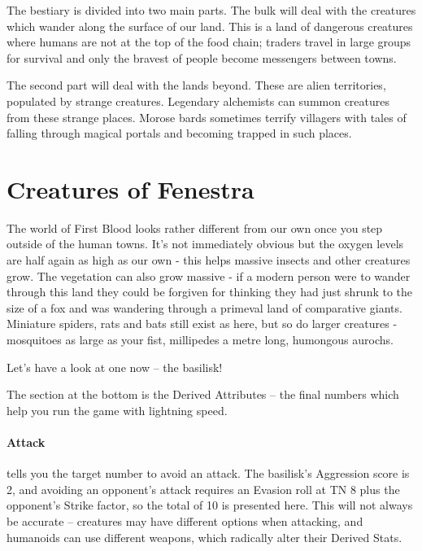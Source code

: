 \setcounter{bestiarychapter}{\thechapter}
The bestiary is divided into two main parts.  The bulk will deal with the creatures which wander along the surface of our land.  This is a land of dangerous creatures where humans are not at the top of the food chain; traders travel in large groups for survival and only the bravest of people become messengers between towns.

The second part will deal with the lands beyond.  These are alien territories, populated by strange creatures.  Legendary alchemists can summon creatures from these strange places.  Morose bards sometimes terrify villagers with tales of falling through magical portals and becoming trapped in such places.

\section{Creatures of Fenestra}

The world of First Blood looks rather different from our own once you step outside of the human towns.  It's not immediately obvious but the oxygen levels are half again as high as our own - this helps massive insects and other creatures grow.  The vegetation can also grow massive - if a modern person were to wander through this land they could be forgiven for thinking they had just shrunk to the size of a fox and was wandering through a primeval land of comparative giants.  Miniature spiders, rats and bats still exist as here, but so do larger creatures  - mosquitoes as large as your fist, millipedes a metre long, humongous aurochs.

Let's have a look at one now -- the basilisk!

\basilisk

The section at the bottom is the Derived Attributes -- the final numbers which help you run the game with lightning speed.

\paragraph{Attack} tells you the target number to avoid an attack.  The basilisk's Aggression score is 2, and avoiding an opponent's attack requires an Evasion roll at TN 8 plus the opponent's Strike factor, so the total of 10 is presented here.  This will not always be accurate -- creatures may have different options when attacking, and humanoids can use different weapons, which radically alter their Derived Stats.

